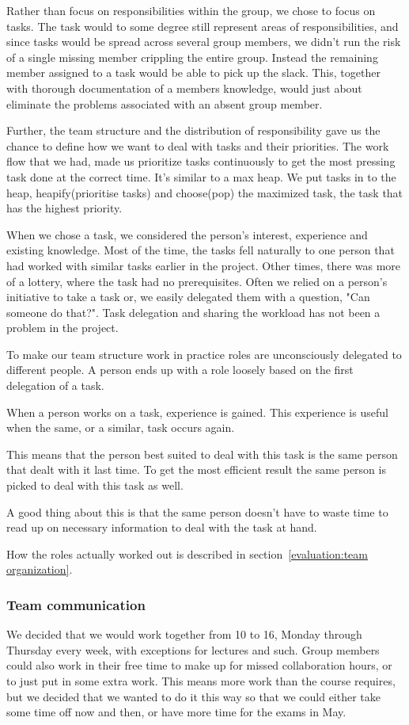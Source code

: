     Rather than focus on responsibilities within the group, we chose to focus on tasks. The task would to some degree still represent areas of responsibilities, and since tasks would be spread across several group members, we didn't run the risk of a single missing member crippling the entire group. Instead the remaining member assigned to a task would be able to pick up the slack. This, together with thorough documentation of a members knowledge, would just about eliminate the problems associated with an absent group member.
        
    Further, the team structure and the distribution of responsibility gave us the chance to define how we want to deal with tasks and their priorities. The work flow that we had, made us prioritize tasks continuously to get the most pressing task done at the correct time. It's similar to a max heap. We put tasks in to the heap, heapify(prioritise tasks) and choose(pop) the maximized task, the task that has the highest priority. 
    
    When we chose a task, we considered the person's interest, experience and existing knowledge. Most of the time, the tasks fell naturally to one person that had worked with similar tasks earlier in the project. Other times, there was more of a lottery, where the task had no prerequisites. Often we relied on a person's initiative to take a task or, we easily delegated them with a question, "Can someone do that?". Task delegation and sharing the workload has not been a problem in the project.
    
    To make our team structure work in practice roles are unconsciously delegated to different people. A person ends up with a role loosely based on the first delegation of a task. 
    
    When a person works on a task, experience is gained. This experience is useful when the same, or a similar, task occurs again. 
    
    This means that the person best suited to deal with this task is the same person that dealt with it last time. To get the most efficient result the same person is picked to deal with this task as well. 

    A good thing about this is that the same person doesn't have to waste time to read up on necessary information to deal with the task at hand.  
    
    How the roles actually worked out is described in section~\ref{evaluation:team organization}.
    
    \subsubsection{Team communication}\label{Team communication}
    We decided that we would work together from 10 to 16, Monday through Thursday every week, with exceptions for lectures and such. Group members could also work in their free time to make up for missed collaboration hours, or to just put in some extra work. This means more work than the course requires, but we decided that we wanted to do it this way so that we could either take some time off now and then, or have more time for the exams in May.

